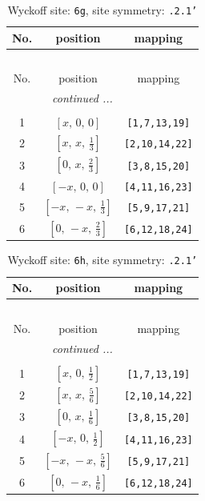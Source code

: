 \documentclass[fleqn,8pt]{jsarticle}
\begin{document}
\renewcommand{\arraystretch}{1.2}
\begin{longtable}{ccc}
\caption{Wyckoff site: {\tt 6g}, site symmetry: {\tt .2.1'}}
 \\
 \hline \hline
No. & position & mapping \\ \hline \endfirsthead

\multicolumn{2}{l}{\tablename\ \thetable{}} \\
 \hline \hline
No. & position & mapping \\ \hline \endhead

 \hline \hline
\multicolumn{2}{r}{\footnotesize\it continued ...} \\ \endfoot

 \hline \hline
\multicolumn{2}{r}{} \\ \endlastfoot

1 & $\left[ x,\, 0,\, 0 \right]$ & {\tt [1,7,13,19]} \\ \hline
2 & $\left[ x,\, x,\, \frac{1}{3} \right]$ & {\tt [2,10,14,22]} \\ \hline
3 & $\left[ 0,\, x,\, \frac{2}{3} \right]$ & {\tt [3,8,15,20]} \\ \hline
4 & $\left[ - x,\, 0,\, 0 \right]$ & {\tt [4,11,16,23]} \\ \hline
5 & $\left[ - x,\, - x,\, \frac{1}{3} \right]$ & {\tt [5,9,17,21]} \\ \hline
6 & $\left[ 0,\, - x,\, \frac{2}{3} \right]$ & {\tt [6,12,18,24]} \\
\end{longtable}
\renewcommand{\arraystretch}{1.2}
\begin{longtable}{ccc}
\caption{Wyckoff site: {\tt 6h}, site symmetry: {\tt .2.1'}}
 \\
 \hline \hline
No. & position & mapping \\ \hline \endfirsthead

\multicolumn{2}{l}{\tablename\ \thetable{}} \\
 \hline \hline
No. & position & mapping \\ \hline \endhead

 \hline \hline
\multicolumn{2}{r}{\footnotesize\it continued ...} \\ \endfoot

 \hline \hline
\multicolumn{2}{r}{} \\ \endlastfoot

1 & $\left[ x,\, 0,\, \frac{1}{2} \right]$ & {\tt [1,7,13,19]} \\ \hline
2 & $\left[ x,\, x,\, \frac{5}{6} \right]$ & {\tt [2,10,14,22]} \\ \hline
3 & $\left[ 0,\, x,\, \frac{1}{6} \right]$ & {\tt [3,8,15,20]} \\ \hline
4 & $\left[ - x,\, 0,\, \frac{1}{2} \right]$ & {\tt [4,11,16,23]} \\ \hline
5 & $\left[ - x,\, - x,\, \frac{5}{6} \right]$ & {\tt [5,9,17,21]} \\ \hline
6 & $\left[ 0,\, - x,\, \frac{1}{6} \right]$ & {\tt [6,12,18,24]} \\
\end{longtable}
\end{document}
